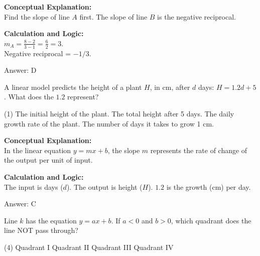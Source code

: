 \documentclass[11pt,paper=a4,answers]{exam}
\begin{document}
\begin{questions}
\begin{solution}
\textbf{Conceptual Explanation:} \\
Find the slope of line $A$ first. The slope of line $B$ is the negative reciprocal.

\vspace{10pt}
\textbf{Calculation and Logic:} \\
$m_A = \frac{8 - 2}{3 - 1} = \frac{6}{2} = 3$. \\
Negative reciprocal = $-1/3$.

\vspace{15pt}
Answer: \colorbox{yellow!100}{D}
\end{solution}

\vspace{20pt}

\question
A linear model predicts the height of a plant $H$, in cm, after $d$ days: $H = 1.2d + 5$. What does the $1.2$ represent?
\begin{tasks}(1)
    \task The initial height of the plant.
    \task The total height after 5 days.
    \task The daily growth rate of the plant.
    \task The number of days it takes to grow 1 cm.
\end{tasks}

\begin{solution}
\textbf{Conceptual Explanation:} \\
In the linear equation $y = mx + b$, the slope $m$ represents the rate of change of the output per unit of input.

\vspace{10pt}
\textbf{Calculation and Logic:} \\
The input is days ($d$). The output is height ($H$). $1.2$ is the growth (cm) per day.

\vspace{15pt}
Answer: \colorbox{yellow!100}{C}
\end{solution}

\vspace{20pt}

\question
Line $k$ has the equation $y = ax + b$. If $a < 0$ and $b > 0$, which quadrant does the line NOT pass through?
\begin{tasks}(4)
    \task Quadrant I
    \task Quadrant II
    \task Quadrant III
    \task Quadrant IV
\end{tasks}


\end{questions}
\end{document}
